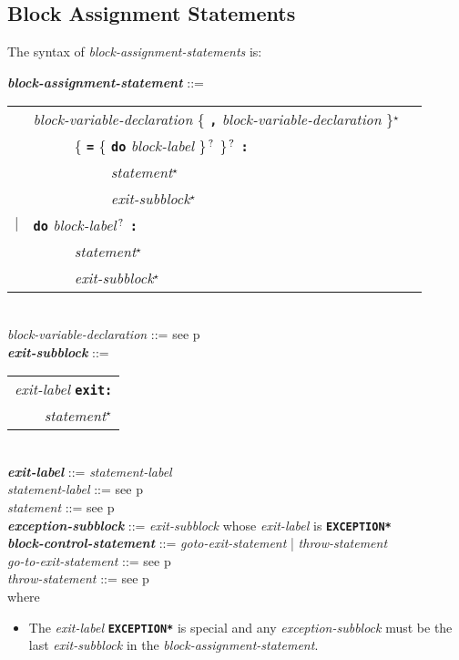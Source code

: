 \documentclass[12pt]{article}
\newcommand{\TT}[1]{{\tt \bfseries #1}}
\newcommand{\STAR}{{\Large $^\star$}}
\newcommand{\QMARK}{{$^{\,\mbox{\footnotesize ?}}$}}
\newcommand{\ttkey}[1]{{\tt \bfseries #1}}
\newcommand{\emkey}[1]{{\em \bfseries #1}}
\newcommand{\pagref}[1]{p\pageref{#1}}
\newenvironment{indpar}[1][0.3in]%
	{\begin{list}{}%
		     {\setlength{\itemsep}{0in}%
		      \setlength{\topsep}{0in}%
		      \setlength{\parsep}{1ex}%
		      \setlength{\labelwidth}{#1}%
		      \setlength{\leftmargin}{#1}%
		      \addtolength{\leftmargin}{\labelsep}}%
	 \item}%
	{\end{list}}
\begin{document}
\subsection{Block Assignment Statements}
\label{BLOCK-ASSIGNMENT-STATEMENTS}

The syntax of {\em block-assignment-statements} is:

\begin{indpar}
\emkey{block-assignment-statement} ::= \\
\hspace*{0.5in}\begin{tabular}[t]{@{}rll}
        & {\em block-variable-declaration}
                \{ \TT{,} {\em block-variable-declaration} \}\STAR{} \\
	& ~~~~~ \{ \TT{=} \{ \ttkey{do} {\em block-label} \}\QMARK{} \}\QMARK{}
		   \TT{:} \\
        & ~~~~~~~~~~ {\em statement}\STAR{} \\
        & ~~~~~~~~~~ {\em exit-subblock}\STAR{} \\
    $|$ & \ttkey{do} {\em block-label}\QMARK{} \TT{:} \\
        & ~~~~~ {\em statement}\STAR{} \\
        & ~~~~~ {\em exit-subblock}\STAR{} \\
    \end{tabular}
\\[0.5ex]
{\em block-variable-declaration} ::=
    see \pagref{BLOCK-VARIABLE-DECLARATION}
\\[0.5ex]
\emkey{exit-subblock}\label{EXIT-SUBBLOCK} ::=
    \begin{tabular}[t]{l}
    {\em exit-label} \ttkey{exit}\TT{:} \\
    \TT{~~~~}{\em statement}\STAR{} \\
    \end{tabular} \\
\emkey{exit-label} ::= {\em statement-label}
\\[0.5ex]
{\em statement-label} ::= see \pagref{STATEMENT-LABEL} \\
{\em statement} ::= see \pagref{STATEMENT}
\\[0.5ex]
\emkey{exception-subblock}\label{EXCEPTION-SUBBLOCK} ::=
    {\em exit-subblock} whose {\em exit-label} is \ttkey{*EXCEPTION*}
\\[0.5ex]
\emkey{block-control-statement}\label{BLOCK-CONTROL-STATEMENT}
	::= {\em goto-exit-statement} | {\em throw-statement} \\
{\em go-to-exit-statement} ::= see \pagref{GO-TO-STATEMENT} \\
{\em throw-statement} ::= see \pagref{THROW-STATEMENT}
\\[2.0ex]
where
\begin{itemize}

\item The {\em exit-label} \ttkey{*EXCEPTION*} is special and
any {\em exception-subblock} must be the last {\em exit-subblock}
in the {\em block-assignment-statement}.

\end{itemize}
\end{indpar}
\end{document}
